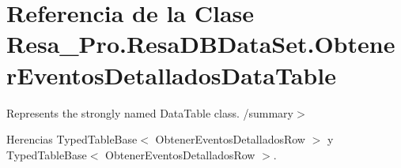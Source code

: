 \section{Referencia de la Clase Resa\+\_\+\+Pro.\+Resa\+D\+B\+Data\+Set.\+Obtener\+Eventos\+Detallados\+Data\+Table}
\label{class_resa___pro_1_1_resa_d_b_data_set_1_1_obtener_eventos_detallados_data_table}


Represents the strongly named Data\+Table class. /summary$>$  




Herencias Typed\+Table\+Base$<$ Obtener\+Eventos\+Detallados\+Row $>$ y Typed\+Table\+Base$<$ Obtener\+Eventos\+Detallados\+Row $>$.

